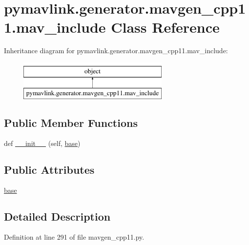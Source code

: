 \hypertarget{classpymavlink_1_1generator_1_1mavgen__cpp11_1_1mav__include}{}\section{pymavlink.\+generator.\+mavgen\+\_\+cpp11.\+mav\+\_\+include Class Reference}
\label{classpymavlink_1_1generator_1_1mavgen__cpp11_1_1mav__include}
Inheritance diagram for pymavlink.\+generator.\+mavgen\+\_\+cpp11.\+mav\+\_\+include\+:\begin{figure}[H]
\begin{center}
\leavevmode
\includegraphics[height=2.000000cm]{classpymavlink_1_1generator_1_1mavgen__cpp11_1_1mav__include}
\end{center}
\end{figure}
\subsection*{Public Member Functions}
\begin{DoxyCompactItemize}
\item 
def \mbox{\hyperlink{classpymavlink_1_1generator_1_1mavgen__cpp11_1_1mav__include_a927802c78d2a11518f56ec6db923dd70}{\+\_\+\+\_\+init\+\_\+\+\_\+}} (self, \mbox{\hyperlink{classpymavlink_1_1generator_1_1mavgen__cpp11_1_1mav__include_ad3e828d0783a3571238a55aef8b94160}{base}})
\end{DoxyCompactItemize}
\subsection*{Public Attributes}
\begin{DoxyCompactItemize}
\item 
\mbox{\hyperlink{classpymavlink_1_1generator_1_1mavgen__cpp11_1_1mav__include_ad3e828d0783a3571238a55aef8b94160}{base}}
\end{DoxyCompactItemize}


\subsection{Detailed Description}


Definition at line 291 of file mavgen\+\_\+cpp11.\+py.



